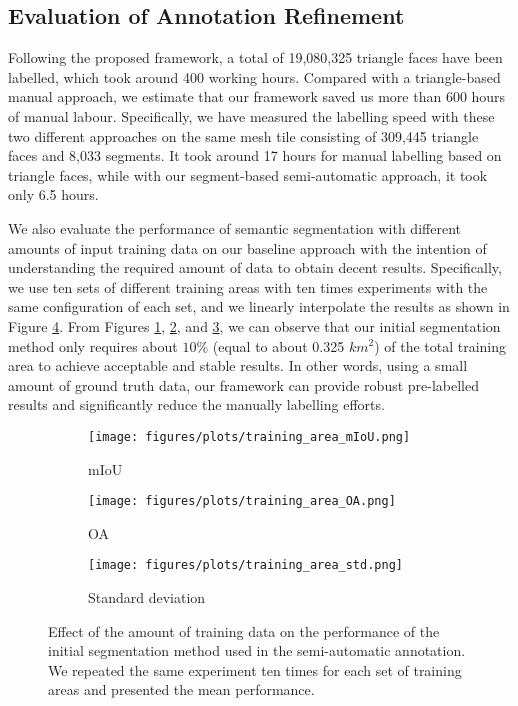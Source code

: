 \subsection{Evaluation of Annotation Refinement}
Following the proposed framework, a total of 19,080,325 triangle faces have been labelled, which took around 400 working hours.
Compared with a triangle-based manual approach, we estimate that our framework saved us more than 600 hours of manual labour.
Specifically, we have measured the labelling speed with these two different approaches on the same mesh tile consisting of 309,445 triangle faces and 8,033 segments.
It took around 17 hours for manual labelling based on triangle faces, while with our segment-based semi-automatic approach, it took only 6.5 hours.  

We also evaluate the performance of semantic segmentation with different amounts of input training data on our baseline approach with the intention of understanding the required amount of data to obtain decent results. 
Specifically, we use ten sets of different training areas with ten times experiments with the same configuration of each set, and we linearly interpolate the results as shown in Figure \ref{fig:tr_area}. 
From Figures \ref{fig:tr_area_miou}, \ref{fig:tr_area_oa}, and \ref{fig:tr_area_std}, we can observe that our initial segmentation method only requires about $10\%$ (equal to about 0.325 $km^2$) of the total training area to achieve acceptable and stable results. 
In other words, using a small amount of ground truth data, our framework can provide robust pre-labelled results and significantly reduce the manually labelling efforts.


\begin{figure}[!tb]
	\centering
	\begin{subfigure}[t]{0.31\textwidth}
		\texttt{[image: figures/plots/training\_area\_mIoU.png]}
		\caption{\textcolor{ao}{mIoU}}
		\label{fig:tr_area_miou}
	\end{subfigure}
	\hspace*{\fill}
	\begin{subfigure}[t]{0.31\textwidth}
		\texttt{[image: figures/plots/training\_area\_OA.png]}
		\caption{\textcolor{ao}{OA}}
		\label{fig:tr_area_oa}
	\end{subfigure}
	\hspace*{\fill}
	\begin{subfigure}[t]{0.32\textwidth}
		\texttt{[image: figures/plots/training\_area\_std.png]}
		\caption{\textcolor{ao}{Standard deviation}}
		\label{fig:tr_area_std}
	\end{subfigure}
	\caption{Effect of the amount of training data on the performance of the initial segmentation method used in the semi-automatic annotation. We repeated the same experiment ten times for each set of training areas and presented the mean performance.}
	\label{fig:tr_area}
\end{figure}
